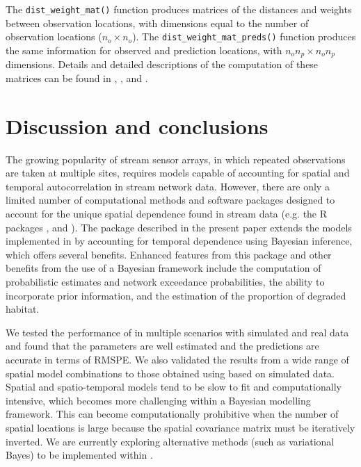 The \texttt{dist\_weight\_mat()} function produces matrices of the distances and weights between observation locations, with dimensions equal to the number of observation locations ($n_o \times n_o$). The \texttt{dist\_weight\_mat\_preds()} function produces the same information for observed and prediction locations, with  $n_o n_p \times n_o n_p$ dimensions.
Details and detailed descriptions of the computation of these matrices can be found in \citet{peterson2010mixed}, \citet{hoef2014ssn}, and \citet{santos2022bayesian}.







\section{Discussion and conclusions}
\label{sec:dis}

The growing popularity of stream sensor arrays, in which repeated observations are taken at multiple sites, requires models capable of accounting for spatial and temporal autocorrelation in stream network data.    
However, there are only a limited number of computational methods and software packages designed to account for the unique spatial dependence found in stream data (e.g. the R packages ,   and ). 
The package described in the present paper extends the models implemented in  by accounting for temporal dependence using Bayesian inference, which offers several benefits.
Enhanced features from this package and other benefits from the use of a Bayesian framework include the computation of probabilistic estimates and network exceedance probabilities, the ability to incorporate prior information, and the estimation of the proportion of degraded habitat.   


We tested the performance of  in multiple scenarios with simulated and real data and found that the parameters are well estimated and the predictions are accurate in terms of RMSPE. 
We also validated the results from a wide range of spatial model combinations to those obtained using  based on simulated data.  
Spatial and spatio-temporal models tend to be slow to fit and computationally intensive, which becomes more challenging within a Bayesian modelling framework. This can become computationally prohibitive when the number of spatial locations is large because the spatial covariance matrix must be iteratively inverted. We are currently exploring alternative methods (such as variational Bayes) to be implemented within .

